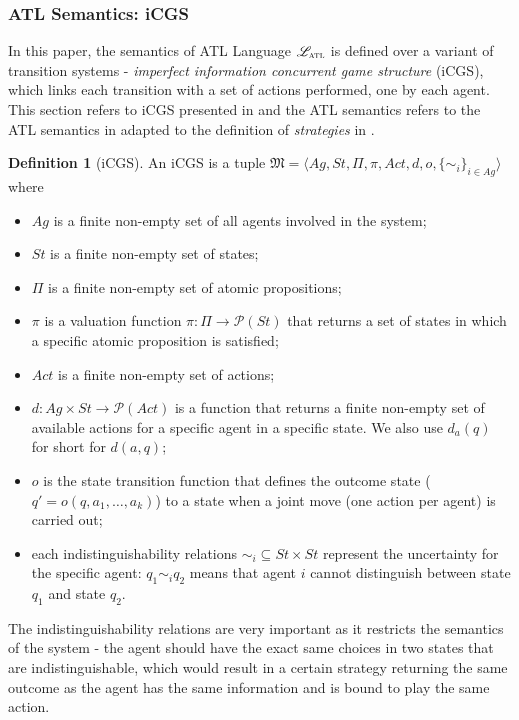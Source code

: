 \documentclass{article}
\theoremstyle{theorem}
\theoremstyle{lemma}
\theoremstyle{definition}
\newtheorem{definition}{Definition}[section]
\theoremstyle{remark}
\begin{document}
\subsubsection{ATL Semantics: iCGS}
\par In this paper, the semantics of ATL Language $\mathscr{L}_\textsc{atl}$ is defined over a variant of transition systems - \textit{imperfect information concurrent game structure} (iCGS), which links each transition with a set of actions performed, one by each agent. This section refers to iCGS presented in \citep{cgs} and the ATL semantics refers to the ATL semantics in \citep{GDLpaper} adapted to the definition of \textit{strategies} in \citep{cgs}.
\begin{definition}[iCGS]
    An iCGS is a tuple
        $\mathfrak{M} = \langle{Ag, St, \Pi, \pi, Act, d, o, \{\sim_{i}\}_{i \in Ag}} \rangle$
    where
    \begin{itemize}
        \item $Ag$ is a finite non-empty set of all agents involved in the system;
        \item $St$ is a finite non-empty set of states;
        \item $\Pi$ is a finite non-empty set of atomic propositions;
        \item $\pi$ is a valuation function $\pi : \Pi \rightarrow \mathscr{P}(St)$ that returns a set of states in which a specific atomic proposition is satisfied;
        \item $Act$ is a finite non-empty set of actions;
        \item $d : Ag \times St \rightarrow \mathscr{P}(Act)$ is a function  that returns a finite non-empty set of available actions for a specific agent in a specific state. We also use $d_a(q)$ for short for $d(a,q)$;
        \item $o$ is the state transition function that defines the outcome state ($q' = o(q, a_{1}, \ldots, a_{k})$) to a state when a joint move (one action per agent) is carried out;
        \item each indistinguishability relations $\sim_{i} \subseteq St \times St$ represent the uncertainty for the specific agent: $q_{1} \sim_{i}  q_{2}$ means that agent $i$ cannot distinguish between state $q_{1}$ and state $q_{2}$.
    \end{itemize}
\end{definition}
\par The indistinguishability relations are very important as it restricts the semantics of the system - the agent should have the exact same choices in two states that are indistinguishable, which would result in a certain strategy returning the same outcome as the agent has the same information and is bound to play the same action.
\end{document}
